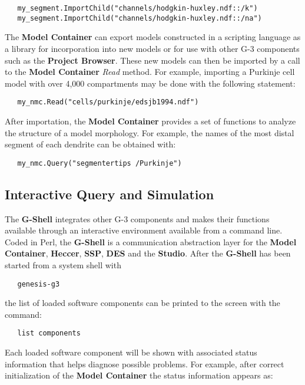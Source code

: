\documentclass[10pt]{article}
\begin{document}
\begin{verbatim}
   my_segment.ImportChild("channels/hodgkin-huxley.ndf::/k")
   my_segment.ImportChild("channels/hodgkin-huxley.ndf::/na")
\end{verbatim}

The {\bf Model Container} can export models constructed in a
scripting language as a library for incorporation into new models or
for use with other G-3 components such as the {\bf Project Browser}.
These new models can then be imported by a call to the {\bf
  Model Container} {\it Read} method. For example, importing a
Purkinje cell model with over 4,000 compartments may be done with the
following statement:

\begin{verbatim}
   my_nmc.Read("cells/purkinje/edsjb1994.ndf")
\end{verbatim}

After importation, the {\bf Model Container} provides a set of
functions to analyze the structure of a model morphology.  For
example, the names of the most distal segment of each dendrite can be
obtained with:

\begin{verbatim}
   my_nmc.Query("segmentertips /Purkinje")
\end{verbatim}

\subsection*{Interactive Query and Simulation}

The {\bf G-Shell} integrates other
G-3 components and makes their functions available through an
interactive environment available from a command line.  Coded in Perl, the {\bf G-Shell} is a
communication abstraction layer for 
the {\bf Model Container}, {\bf Heccer}, {\bf SSP}, {\bf DES} and the {\bf
  Studio}.  After the {\bf G-Shell} has been started from a system
shell with
\begin{verbatim}
   genesis-g3
\end{verbatim}
the list of loaded software components can be printed to the screen with the command:

\begin{verbatim}
   list components
\end{verbatim}

Each loaded software component will be shown with associated status
information that helps diagnose possible problems.  For
example, after correct initialization of the {\bf Model Container} the
status information appears as:
\end{document}
